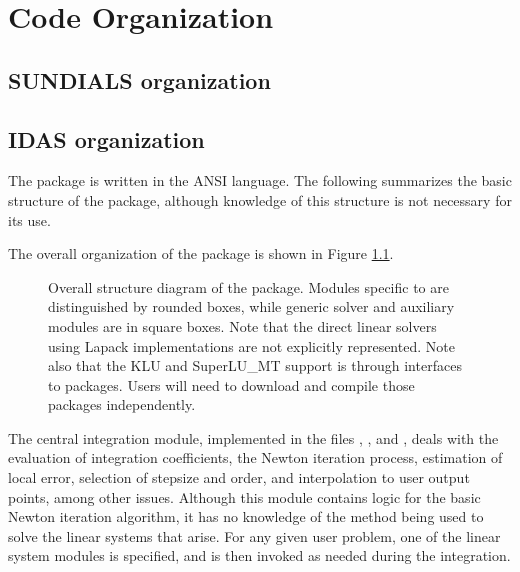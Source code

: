 \chapter{Code Organization}\label{s:organization}

\section{SUNDIALS organization}\label{ss:sun_org}


\section{IDAS organization}\label{ss:idas_org}

The {\idas} package is written in the ANSI {\C} language. The following
summarizes the basic structure of the package, although knowledge
of this structure is not necessary for its use.

The overall organization of the {\idas} package is shown in Figure
\ref{f:idasorg}.
\begin{figure}
{\centerline{}}
\caption [Overall structure diagram of the {\idas} package]
{Overall structure diagram of the {\idas} package.
  Modules specific to {\idas} are distinguished by rounded boxes, while 
  generic solver and auxiliary modules are in square boxes.
  Note that the direct linear solvers using Lapack implementations are not 
  explicitly represented.
  Note also that the KLU and SuperLU\_MT support 
  is through interfaces
  to packages.  Users will need to download and compile those packages independently.}
\label{f:idasorg}
\end{figure}
The central integration module, implemented in the files ,
, and , deals with the evaluation of integration 
coefficients, the Newton iteration process, estimation of local error,
selection of stepsize and order, and interpolation to user output
points, among other issues.  Although this module contains logic for
the basic Newton iteration algorithm, it has no knowledge of the
method being used to solve the linear systems that arise.  For any
given user problem, one of the linear system modules is specified, and
is then invoked as needed during the integration. 


